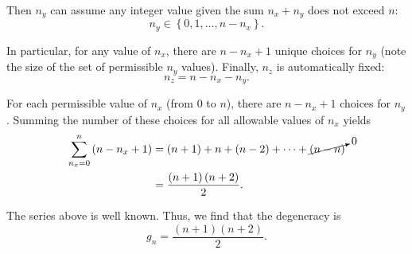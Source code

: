 \documentclass{article}
\numberwithin{equation}{section}
\begin{document}
Then $n_y$ can assume any integer value given the sum $n_x + n_y$ does not exceed $n$:
\begin{equation*}
    n_y \in \left\{ 0, 1, \dots, n - n_x \right\}.
\end{equation*}

In particular, for any value of $n_x$, there are $n - n_x + 1$ unique choices for $n_y$ (note the size of the set of permissible $n_y$ values). Finally, $n_z$ is automatically fixed:
\begin{equation*}
    n_z = n - n_x - n_y.
\end{equation*}

For each permissible value of $n_x$ (from $0$ to $n$), there are $n - n_x + 1$ choices for $n_y$. Summing the number of these choices for all allowable values of $n_x$ yields
\begin{align*}
    \sum\limits_{n_x = 0}^n \left( n - n_x + 1 \right) &= \left(n + 1\right) + n + \left(n - 2\right) + \cdots + \cancelto{0}{\left(n - n\right)} \\
                                                       &= \frac{\left(n+1\right) \left(n+2\right)}{2}.
\end{align*}

The series above is well known. Thus, we find that the degeneracy is
\begin{equation*}
    g_n = \frac{\left(n+1\right) \left(n+2\right)}{2}.
\end{equation*}
\end{document}
